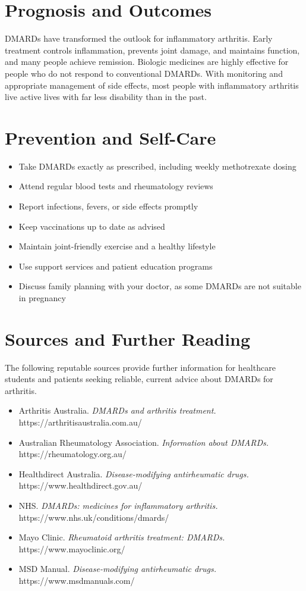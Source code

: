 \section*{Prognosis and Outcomes}
DMARDs have transformed the outlook for inflammatory arthritis. Early treatment controls inflammation, prevents joint damage, and maintains function, and many people achieve remission. Biologic medicines are highly effective for people who do not respond to conventional DMARDs. With monitoring and appropriate management of side effects, most people with inflammatory arthritis live active lives with far less disability than in the past.

\section*{Prevention and Self-Care}
\begin{itemize}
    \item Take DMARDs exactly as prescribed, including weekly methotrexate dosing
    \item Attend regular blood tests and rheumatology reviews
    \item Report infections, fevers, or side effects promptly
    \item Keep vaccinations up to date as advised
    \item Maintain joint-friendly exercise and a healthy lifestyle
    \item Use support services and patient education programs
    \item Discuss family planning with your doctor, as some DMARDs are not suitable in pregnancy
\end{itemize}

\section*{Sources and Further Reading}
The following reputable sources provide further information for healthcare students and patients seeking reliable, current advice about DMARDs for arthritis.

\begin{itemize}
    \item Arthritis Australia. \textit{DMARDs and arthritis treatment.} https://arthritisaustralia.com.au/
    \item Australian Rheumatology Association. \textit{Information about DMARDs.} https://rheumatology.org.au/
    \item Healthdirect Australia. \textit{Disease-modifying antirheumatic drugs.} https://www.healthdirect.gov.au/
    \item NHS. \textit{DMARDs: medicines for inflammatory arthritis.} https://www.nhs.uk/conditions/dmards/
    \item Mayo Clinic. \textit{Rheumatoid arthritis treatment: DMARDs.} https://www.mayoclinic.org/
    \item MSD Manual. \textit{Disease-modifying antirheumatic drugs.} https://www.msdmanuals.com/
\end{itemize}
